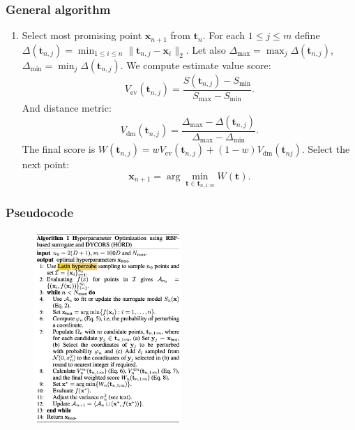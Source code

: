 \documentclass{beamer}
\begin{document}
\begin{frame}
  \frametitle{General algorithm}
  \begin{enumerate}[3]
    \item Select most promising point $\mathbf{x}_{n+1}$ from $\mathbf{t}_n$.
    For each $1\leq j\leq m$ define
    $\Delta(\mathbf{t}_{n,j}) = \min_{1\leq i \leq n}\|\mathbf{t}_{n,j} - \mathbf{x}_i\|_2$.
    Let also $\Delta_\text{max} = \max_{j}\Delta(\mathbf{t}_{n,j})$,
    $\Delta_\text{min} = \min_{j}\Delta(\mathbf{t}_{n,j})$.
    We compute estimate value score:
    \[
      V_\text{ev}(\mathbf{t}_{n,j}) = \frac{S(\mathbf{t}_{n,j}) - S_\text{min}}{S_\text{max} - S_\text{min}}.
    \]
    And distance metric:
    \[
      V_\text{dm}(\mathbf{t}_{n,j}) = \frac{\Delta_\text{max} - \Delta(\mathbf{t}_{n,j})}{\Delta_\text{max} - \Delta_\text{min}}.
    \]
    The final score is $W(\mathbf{t}_{n,j}) = wV_\text{ev}(\mathbf{t}_{n,j}) + (1-w)V_\text{dm}(\mathbf{t}_{nj})$.
    Select the next point:
    \[
      \mathbf{x}_{n + 1} = \arg\min_{\mathbf{t} \in \mathbf{t}_{n,1:m}}W(\mathbf{t}).
    \]
  \end{enumerate}
\end{frame}


\begin{frame}
  \frametitle{Pseudocode}
  \begin{figure}
    \centering
    \includegraphics[width=0.5\textwidth]{pseudocode.png}
  \end{figure}
\end{frame}
\end{document}

